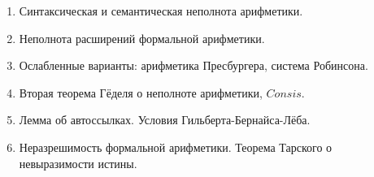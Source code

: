 \documentclass[11pt,a4paper,oneside]{scrartcl}
\begin{document}
\begin{enumerate}
\begin{enumerate}
неполноте арифметики в форме Россера. 
\item Синтаксическая и семантическая неполнота арифметики.
\item Неполнота расширений формальной арифметики.
\item Ослабленные варианты: арифметика Пресбургера, система Робинсона.
\item Вторая теорема Гёделя о неполноте арифметики, $Consis$. 
\item Лемма об автоссылках. Условия Гильберта-Бернайса-Лёба. 
\item Неразрешимость формальной арифметики. Теорема Тарского о невыразимости истины.
\end{enumerate}
\end{enumerate}
\end{document}
